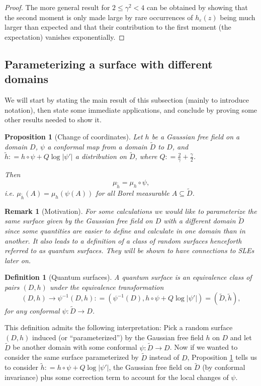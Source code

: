 \documentclass[11pt,reqno]{amsart}
\numberwithin{equation}{section}
\newtheorem{pro}[thm]{Proposition}
\newtheorem{defi}[thm]{Definition}
\newtheorem{rem}[thm]{Remark}
\newcommand{\deq}{\mathrel{\mathop:}=}
\newcommand{\eps}{\varepsilon}
\begin{document}
\begin{proof}
	The more general result for $2\leq\gamma^2<4$ can be obtained by showing that the second moment is only made large by rare occurrences of $h_\eps(z)$ being much larger than expected and that their contribution to the first moment (the expectation) vanishes exponentially.
\end{proof}

\subsection{Parameterizing a surface with different domains}
We will start by stating the main result of this subsection (mainly to introduce notation), then state some immediate applications, and conclude by proving some other results needed to show it.
\begin{pro}[Change of coordinates]\label{prop:changeofcoordinates}
	Let $h$ be a Gaussian free field on a domain $D$, $\psi$ a conformal map from a domain $\tilde D$ to $D$, and $\tilde h\deq h\circ\psi+Q\log|\psi'|$ a distribution on $\tilde D$, where $Q\deq \frac{2}{\gamma}+\frac{\gamma}{2}$.
	
	Then $$\mu_{\tilde h}=\mu_h\circ\psi,$$
	i.e. $\mu_{\tilde h}(A)=\mu_h(\psi(A))$ for all Borel measurable $A\subseteq \tilde D$.
\end{pro}
\begin{rem}[Motivation]
	For some calculations we would like to parameterize the same surface given by the Gaussian free field on $D$ with a different domain $\tilde D$ since some quantities are easier to define and calculate in one domain than in another. It also leads to a definition of a class of random surfaces henceforth referred to as quantum surfaces. They will be shown to have connections to SLEs later on.
\end{rem}

\begin{defi}[Quantum surfaces]\label{def:quantumsurface}
	A quantum surface is an equivalence class of pairs $(D,h)$ under the equivalence transformation $$(D,h)\rightarrow \psi^{-1}(D,h)\deq (\psi^{-1}(D),h\circ\psi+Q\log|\psi'|)=(\tilde D,\tilde h),$$
	for any conformal $\psi:\tilde D\rightarrow D$.
\end{defi}

This definition admits the following interpretation: Pick a random surface $(D,h)$ induced (or ``parameterized'') by the Gaussian free field $h$ on $D$ and let $\tilde D$ be another domain with some conformal $\psi:\tilde D\rightarrow D$. Now if we wanted to consider the same surface parameterized by $\tilde D$ instead of $D$, Proposition \ref{prop:changeofcoordinates} tells us to consider $\tilde h\deq h\circ\psi + Q\log|\psi'|$, the Gaussian free field on $\tilde D$ (by conformal invariance) plus some correction term to account for the local changes of $\psi$.
\end{document}
